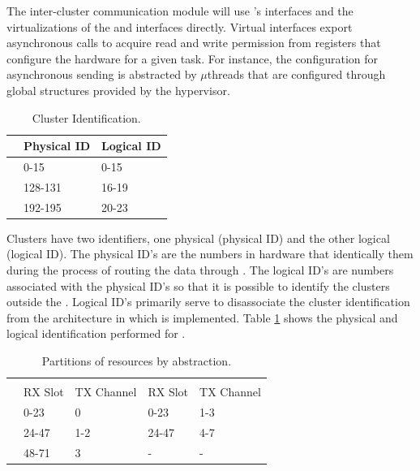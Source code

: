 	The inter-cluster communication module will use \hal's interfaces and the
	virtualizations of the \cnoc and \dnoc interfaces directly.
	Virtual \noc interfaces export asynchronous calls to acquire read and write
	permission from registers that configure the hardware for a given task.
	For instance, the \dma configuration for asynchronous sending is abstracted by
	$\mu$threads that are configured through global structures provided by the hypervisor.

	\begin{table}[t]
		\caption{Cluster Identification.}

		\begin{tabular}{|l|l|l|}
			\hline
						& Physical ID & Logical ID \\ \hline
			\ccluster   & 0-15        & 0-15       \\ \hline
			\iocluster0 & 128-131     & 16-19      \\ \hline
			\iocluster1 & 192-195     & 20-23      \\ \hline
		\end{tabular}

		\label{tab.cluster-id}
	\end{table}

	Clusters have two identifiers, one physical (physical ID) and the
	other logical (logical ID).
	The physical ID's are the numbers in hardware that identically them
	during the process of routing the data through \noc.
	The logical ID's are numbers associated with the physical ID's so
	that it is possible to identify the clusters outside the \hal.
	Logical ID's primarily serve to disassociate the cluster
	identification from the architecture in which \hal is implemented.
	Table \ref{tab.cluster-id} shows the physical and logical
	identification performed for \mppa.

	\begin{table}[]
		\caption{Partitions of \noc resources by abstraction.}

		\begin{tabular}{l|l|l|l|l|}
			\cline{2-5}
										   & \multicolumn{2}{c|}{\cnoc} & \multicolumn{2}{c|}{\dnoc} \\ \cline{2-5}
										   & RX Slot & TX Channel & RX Slot & TX Channel \\ \hline
			\multicolumn{1}{|l|}{\mailbox} & 0-23    & 0          & 0-23    & 1-3        \\ \hline
			\multicolumn{1}{|l|}{\portal}  & 24-47   & 1-2        & 24-47   & 4-7        \\ \hline
			\multicolumn{1}{|l|}{\sync}    & 48-71   & 3          & -       & -          \\ \hline
		\end{tabular}

		\label{tab.noc-resources}
	\end{table}

